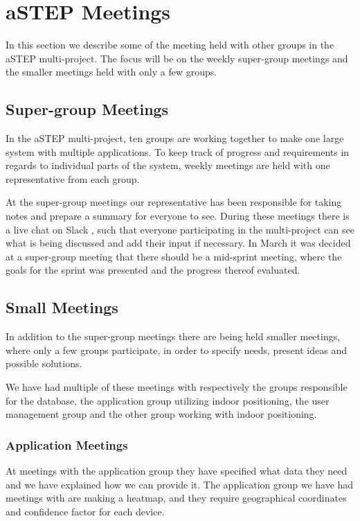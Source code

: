 \section{aSTEP Meetings}
In this section we describe some of the meeting held with other groups in the aSTEP multi-project. The focus will be on the weekly super-group meetings and the smaller meetings held with only a few groups.

\subsection{Super-group Meetings}\label{subsec:supergroup_meetings}
In the aSTEP multi-project, ten groups are working together to make one large system with multiple applications. To keep track of progress and requirements in regards to individual parts of the system, weekly meetings are held with one representative from each group.

At the super-group meetings our representative has been responsible for taking notes and prepare a summary for everyone to see. During these meetings there is a live chat on Slack \cite{slack}, such that everyone participating in the multi-project can see what is being discussed and add their input if necessary. In March it was decided at a super-group meeting that there should be a mid-sprint meeting, where the goals for the sprint was presented and the progress thereof evaluated.

\subsection{Small Meetings}\label{subsec:small_meetings}
In addition to the super-group meetings there are being held smaller meetings, where only a few groups participate, in order to specify needs, present ideas and possible solutions.

We have had multiple of these meetings with respectively the groups responsible for the database, the application group utilizing indoor positioning, the user management group and the other group working with indoor positioning.
 
\subsubsection*{Application Meetings}
At meetings with the application group they have specified what data they need and we have explained how we can provide it. The application group we have had meetings with are making a heatmap, and they require geographical coordinates and confidence factor for each device.

